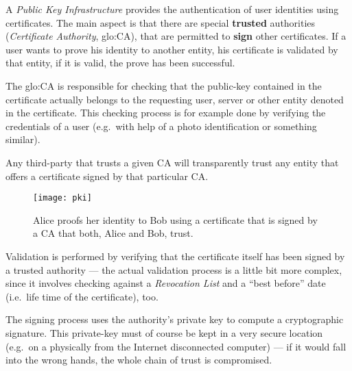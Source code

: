 A  \emph{Public Key  Infrastructure} provides  the authentication  of user
identities using certificates.  The main  aspect is that there are special
\textbf{trusted} authorities (\emph{Certificate Authority}, \gls{glo:CA}),
that are permitted  to \textbf{sign} other certificates.  If  a user wants
to prove his  identity to another entity, his  certificate is validated by
that entity, if it is valid, the prove has been successful.

The \gls{glo:CA} is responsible for checking that the public-key contained
in  the certificate  actually belongs  to the  requesting user,  server or
other  entity denoted  in the  certificate. This  checking process  is for
example done by  verifying the credentials of a user  (e.g.~with help of a
photo identification or something similar).

Any third-party that trusts a given CA will transparently trust any entity
that offers a certificate signed by that particular CA.

\begin{figure}[h]
  \centering
  \texttt{[image: pki]}
  \caption[Public  Key Infrastructure]{Alice  proofs her  identity  to Bob
    using a certificate  that is signed by a CA that  both, Alice and Bob,
    trust.}
  \label{fig:pki}
\end{figure}

Validation is performed by verifying  that the certificate itself has been
signed  by a  trusted authority  --- the  actual validation  process  is a
little   bit  more  complex,   since  it   involves  checking   against  a
\emph{Revocation List} and  a ``best before'' date (i.e.~life  time of the
certificate), too.

The  signing  process  uses  the  authority's private  key  to  compute  a
cryptographic signature. This private-key must of course be kept in a very
secure  location  (e.g.~on a  physically  from  the Internet  disconnected
computer) ---  if it would fall into  the wrong hands, the  whole chain of
trust is compromised.

